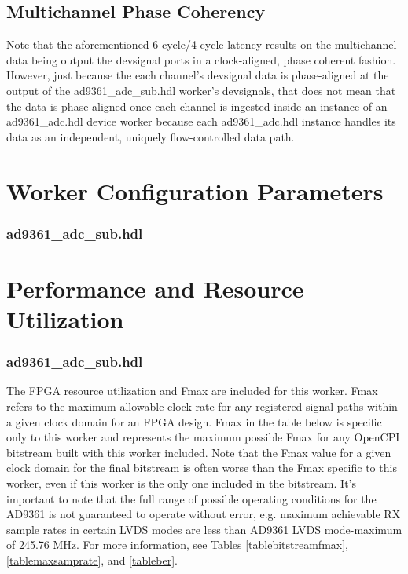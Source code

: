 \documentclass{article}
\def\comp{ad9361\_adc\_sub}
\edef\ecomp{ad9361_adc_sub}
\begin{document}
\subsection*{Multichannel Phase Coherency}
Note that the aforementioned 6 cycle/4 cycle latency results on the multichannel data being output the devsignal ports in a clock-aligned, phase coherent fashion. However, just because the each channel's devsignal data is phase-aligned at the output of the \comp{}.hdl worker's devsignals, that does not mean that the data is phase-aligned once each channel is ingested inside an instance of an ad9361\_adc.hdl device worker because each ad9361\_adc.hdl instance handles its data as an independent, uniquely flow-controlled data path.

\pagebreak
\section*{Worker Configuration Parameters}
\subsubsection*{\comp.hdl}

\section*{Performance and Resource Utilization}
\subsubsection*{\comp.hdl}

\noindent
The FPGA resource utilization and Fmax are included for this worker. Fmax refers to the maximum allowable clock rate for any registered signal paths within a given clock domain for an FPGA design. Fmax in the table below is specific only to this worker and represents the maximum possible Fmax for any OpenCPI bitstream built with this worker included. Note that the Fmax value for a given clock domain for the final bitstream is often worse than the Fmax specific to this worker, even if this worker is the only one included in the bitstream. It's important to note that the full range of possible operating conditions for the AD9361 is not guaranteed to operate without error, e.g. maximum achievable RX sample rates in certain LVDS modes are less than AD9361 LVDS mode-maximum of 245.76 MHz\cite{adi_ug570}. For more information, see Tables \ref{tablebitstreamfmax}, \ref{tablemaxsamprate}, and \ref{tableber}. \\
\end{document}
